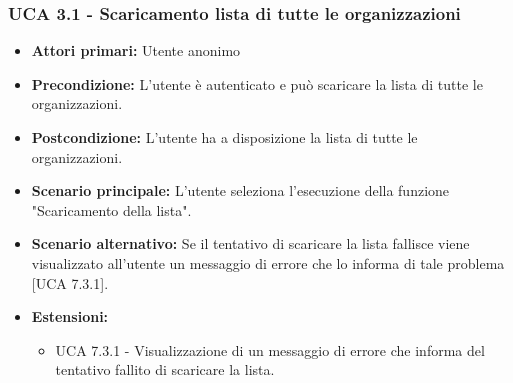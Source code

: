 \subsubsection{UCA 3.1 - Scaricamento lista di tutte le organizzazioni}%
\begin{itemize}
\item \textbf{Attori primari:} Utente anonimo
\item \textbf{Precondizione:} L'utente è autenticato e può scaricare la lista di tutte le organizzazioni.
\item \textbf{Postcondizione:} L'utente ha a disposizione la lista di tutte le organizzazioni.
\item \textbf{Scenario principale:} L'utente seleziona l'esecuzione della funzione "Scaricamento della lista".
\item \textbf{Scenario alternativo:} Se il tentativo di scaricare la lista fallisce viene visualizzato all'utente un messaggio di errore che lo informa di tale problema [UCA 7.3.1].
\item \textbf{Estensioni:}
	\begin{itemize}
	\item UCA 7.3.1 - Visualizzazione di un messaggio di errore che informa del tentativo fallito di scaricare la lista.
\end{itemize}
  
\end{itemize}


